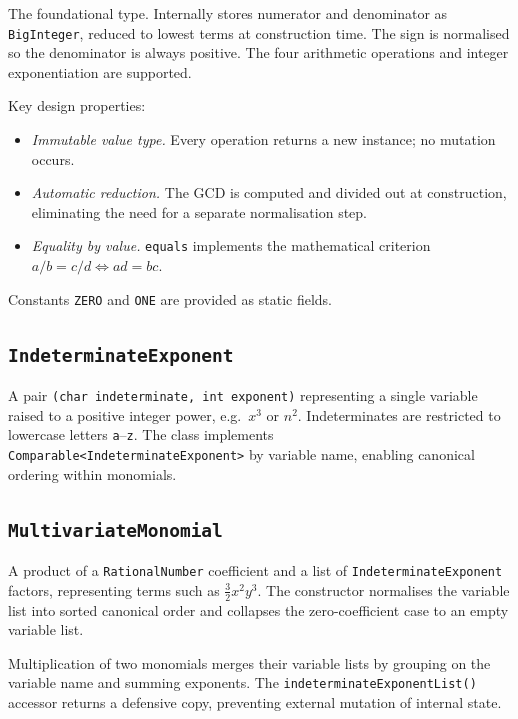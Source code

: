 \documentclass[11pt,a4paper]{article}
\begin{document}
The foundational type. Internally stores numerator and denominator as
\texttt{BigInteger}, reduced to lowest terms at construction time.
The sign is normalised so the denominator is always positive.
The four arithmetic operations and integer exponentiation are supported.

Key design properties:
\begin{itemize}[noitemsep]
  \item \textit{Immutable value type.} Every operation returns a new instance;
        no mutation occurs.
  \item \textit{Automatic reduction.} The GCD is computed and divided out at
        construction, eliminating the need for a separate normalisation step.
  \item \textit{Equality by value.} \texttt{equals} implements the mathematical
        criterion $a/b = c/d \iff ad = bc$.
\end{itemize}

Constants \texttt{ZERO} and \texttt{ONE} are provided as static fields.

\subsection{\texttt{IndeterminateExponent}}

A pair \texttt{(char indeterminate, int exponent)} representing a single
variable raised to a positive integer power, e.g.\ $x^{3}$ or $n^{2}$.
Indeterminates are restricted to lowercase letters \texttt{a}--\texttt{z}.
The class implements \texttt{Comparable\textless{}IndeterminateExponent\textgreater{}}
by variable name, enabling canonical ordering within monomials.

\subsection{\texttt{MultivariateMonomial}}

A product of a \texttt{RationalNumber} coefficient and a list of
\texttt{IndeterminateExponent} factors, representing terms such as
$\tfrac{3}{2}x^{2}y^{3}$.
The constructor normalises the variable list into sorted canonical order and
collapses the zero-coefficient case to an empty variable list.

Multiplication of two monomials merges their variable lists by grouping on the
variable name and summing exponents.
The \texttt{indeterminateExponentList()} accessor returns a defensive copy,
preventing external mutation of internal state.
\end{document}
